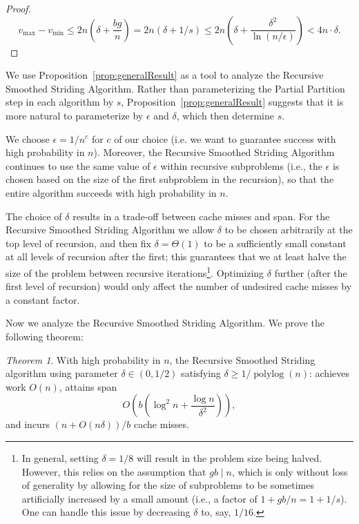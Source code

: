 \documentclass[11pt]{article}
\newcommand{\polylog}{\operatorname{polylog}}
\theoremstyle{remark}
\newtheorem{theorem}{Theorem}[section]
\theoremstyle{remark}
\begin{document}
\begin{proof}
$$v_{\text{max}} - v_{\text{min}} \le 2n \left( \delta +
\frac{bg}{n} \right)  = 2n \left( \delta + 1/s \right) \le
2n \left(\delta + \frac{\delta^2}{\ln (n / \epsilon)}\right) <
4n\cdot\delta.$$

\end{proof}

We use Proposition~\ref{prop:generalResult} as a tool to analyze
the Recursive Smoothed Striding Algorithm.
Rather than parameterizing the Partial Partition step in each
algorithm by $s$, Proposition~\ref{prop:generalResult} suggests
that it is more natural to parameterize by $\epsilon$ and
$\delta$, which then determine $s$.

We choose $\epsilon = 1/n^c$ for $c$ of our choice (i.e. we want
to guarantee success with high probability in $n$). Moreover, the
Recursive Smoothed Striding Algorithm continues to use the same
value of $\epsilon$ within recursive subproblems (i.e., the
$\epsilon$ is chosen based on the size of the first subproblem in
the recursion), so that the entire algorithm succeeds with high
probability in $n$.

The choice of $\delta$ results in a trade-off between cache
misses and span. For the Recursive Smoothed Striding Algorithm we
allow $\delta$ to be chosen arbitrarily at the top level of
recursion, and then fix $\delta  = \Theta(1)$ to be a
sufficiently small constant at all levels of recursion after the
first; this guarantees that we at least halve the size of the
problem between recursive iterations\footnote{In general, setting
  $\delta = 1/8$ will result in the problem size being halved.
  However, this relies on the assumption that $gb \mid n$, which
  is only without loss of generality by allowing for the size of
subproblems to be sometimes artificially increased by a small
amount (i.e., a factor of $1 + gb / n = 1 + 1/s$). One can handle
this issue by decreasing $\delta$ to, say, $1/16$.}. Optimizing
$\delta$ further (after the first level of recursion) would only
affect the number of undesired cache misses by a constant factor.

Now we analyze the Recursive Smoothed Striding Algorithm. We
prove the following theorem:
\begin{theorem}
  \label{thm:groupedPartitionAlg}
  With high probability in $n$, the Recursive Smoothed Striding
  algorithm using parameter $\delta \in(0,1/2)$ satisfying
  $\delta \ge 1 / \polylog(n)$: achieves work $O(n)$, attains
  span $$O\left(b\left(\log^2 n + \frac{\log
  n}{\delta^2}\right)\right),$$ and incurs $(n+O(n \delta))/b$
  cache misses. 
\end{theorem}
\end{document}
